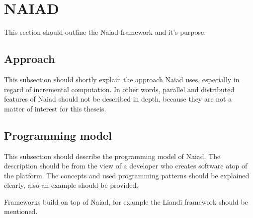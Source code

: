 \section{NAIAD}
This section should outline the Naiad framework and it's purpose. 

\subsection{Approach}
This subsection should shortly explain the approach Naiad uses, especially in regard of incremental computation. 
In other words, parallel and distributed features of Naiad should not be described in depth, because they are not a matter of interest for this theseis. 

\subsection{Programming model}
This subsection should describe the programming model of Naiad. The description should be from the view of a developer who creates software atop of the platform. The concepts and used programming patterns should be explained clearly, also an example should be provided. 

Frameworks build on top of Naiad, for example the Liandi framework should be mentioned. 